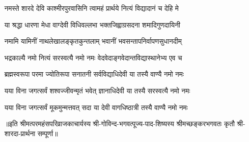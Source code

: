 

\twolineshloka
{नमस्ते शारदे देवि काश्मीरपुरवासिनि}
{त्वामहं प्रार्थये नित्यं विद्यादानं च देहि मे}

\twolineshloka
{या श्रद्धा धारणा मेधा वाग्देवी विधिवल्लभा}
{भक्तजिह्वाग्रसदना शमादिगुणदायिनी}

\twolineshloka
{नमामि यामिनीं नाथलेखालङ्कृतकुन्तलाम्}
{भवानीं भवसन्तापनिर्वापणसुधानदीम्}

\twolineshloka
{भद्रकाल्यै नमो नित्यं सरस्वत्यै नमो नमः}
{वेदवेदाङ्गवेदान्तविद्यास्थानेभ्य एव च}

\twolineshloka
{ब्रह्मस्वरूपा परमा ज्योतिरूपा सनातनी}
{सर्वविद्याधिदेवी या तस्यै वाण्यै नमो नमः}

\twolineshloka
{यया विना जगत्सर्वं शश्वज्जीवन्मृतं भवेत्}
{ज्ञानाधिदेवी या तस्यै सरस्वत्यै नमो नमः}

\twolineshloka
{यया विना जगत्सर्वं मूकमुन्मत्तवत् सदा}
{या देवी वागधिष्ठात्री तस्यै वाण्यै नमो नमः}

॥इति  श्रीमत्परमहंसपरिव्राजकाचार्यस्य श्री-गोविन्द-भगवत्पूज्य-पाद-शिष्यस्य
श्रीमच्छङ्करभगवतः कृतौ श्री-शारदा-प्रार्थना सम्पूर्णा॥
